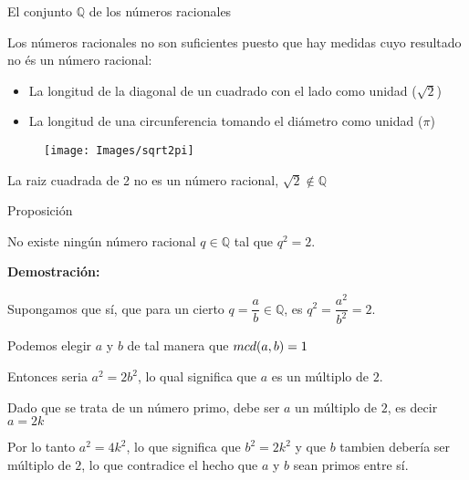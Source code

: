 \documentclass[ignorenonframetext,]{beamer}
\providecommand{\tightlist}{%
  \setlength{\itemsep}{0pt}\setlength{\parskip}{0pt}}
\begin{document}
\begin{frame}{El conjunto \(\mathbb{Q}\) de los números racionales}
\protect\hypertarget{el-conjunto-mathbbq-de-los-nuxfameros-racionales-1}{}

Los números racionales no son suficientes puesto que hay medidas cuyo
resultado no és un número racional:

\begin{itemize}
\tightlist
\item
  La longitud de la diagonal de un cuadrado con el lado como unidad
  (\(\sqrt{2}\))
\item
  La longitud de una circunferencia tomando el diámetro como unidad
  (\(\pi\))
\end{itemize}

\begin{figure}
\texttt{[image: Images/sqrt2pi]} \end{figure}

\end{frame}

\begin{frame}{La raiz cuadrada de 2 no es un número racional,
\(\sqrt{2} \notin \mathbb{Q}\)}
\protect\hypertarget{la-raiz-cuadrada-de-2-no-es-un-nuxfamero-racional-sqrt2-notin-mathbbq}{}

Proposición

No existe ningún número racional \(q \in \mathbb{Q}\) tal que \(q^2=2\).

\textbf{Demostración:}

Supongamos que sí, que para un cierto
\(q =\dfrac{a}{b} \in \mathbb{Q}\), es \(q^2=\dfrac{a^2}{b^2} = 2\).

Podemos elegir \(a\) y \(b\) de tal manera que \(\\mcd(a,b)=1\)

Entonces seria \(a^2=2b^2\), lo qual significa que \(a\) es un múltiplo
de \(2\).

Dado que se trata de un número primo, debe ser \(a\) un múltiplo de
\(2\), es decir \(a=2k\)

Por lo tanto \(a^2 = 4k^2\), lo que significa que \(b^2=2k^2\) y que
\(b\) tambien debería ser múltiplo de \(2\), lo que contradice el hecho
que \(a\) y \(b\) sean primos entre sí.

\end{frame}
\end{document}
